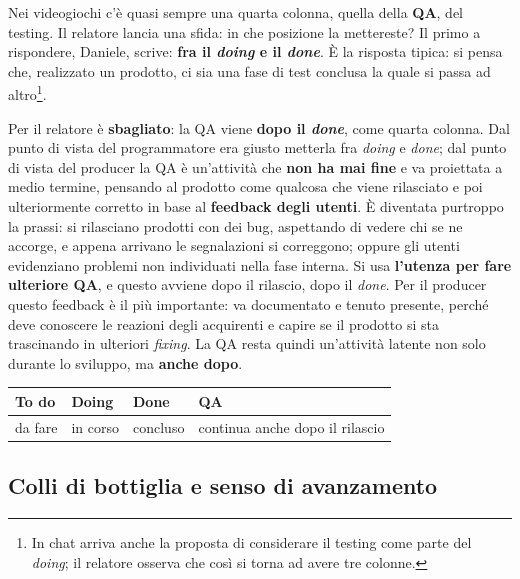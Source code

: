 Nei videogiochi c'è quasi sempre una quarta colonna, quella della \textbf{QA},
del testing. Il relatore lancia una sfida: in che posizione la mettereste? Il
primo a rispondere, Daniele, scrive: \textbf{fra il \emph{doing} e il
\emph{done}}. È la risposta tipica: si pensa che, realizzato un prodotto, ci sia
una fase di test conclusa la quale si passa ad altro\footnote{In chat arriva
anche la proposta di considerare il testing come parte del \emph{doing}; il
relatore osserva che così si torna ad avere tre colonne.}.

Per il relatore è \textbf{sbagliato}: la QA viene \textbf{dopo il \emph{done}},
come quarta colonna. Dal punto di vista del programmatore era giusto metterla
fra \emph{doing} e \emph{done}; dal punto di vista del producer la QA è
un'attività che \textbf{non ha mai fine} e va proiettata a medio termine,
pensando al prodotto come qualcosa che viene rilasciato e poi ulteriormente
corretto in base al \textbf{feedback degli utenti}. È diventata purtroppo la
prassi: si rilasciano prodotti con dei bug, aspettando di vedere chi se ne
accorge, e appena arrivano le segnalazioni si correggono; oppure gli utenti
evidenziano problemi non individuati nella fase interna. Si usa
\textbf{l'utenza per fare ulteriore QA}, e questo avviene dopo il rilascio,
dopo il \emph{done}. Per il producer questo feedback è il più importante: va
documentato e tenuto presente, perché deve conoscere le reazioni degli
acquirenti e capire se il prodotto si sta trascinando in ulteriori
\emph{fixing}. La QA resta quindi un'attività latente non solo durante lo
sviluppo, ma \textbf{anche dopo}.
\begin{center}
  \begin{tabular}{@{}llll@{}}
    \toprule
    \textbf{To do} & \textbf{Doing} & \textbf{Done} & \textbf{QA} \\
    \midrule
    da fare & in corso & concluso & continua anche dopo il rilascio \\
    \bottomrule
  \end{tabular}
\end{center}

\subsection{Colli di bottiglia e senso di avanzamento}

